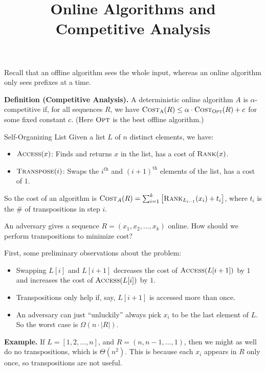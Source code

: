 \title{Online Algorithms and Competitive Analysis}



Recall that an offline algorithm sees the whole input, whereas an online algorithm only sees prefixes at a time.

\textbf{Definition (Competitive Analysis).} A deterministic online algorithm $A$ is $\alpha$-competitive if, for all sequences $R$, we have $\textsc{Cost}_{\textsc{A}}(R) \leq \alpha \cdot \textsc{Cost}_{\textsc{Opt}}(R) + c$ for some fixed constant $c$.  (Here $\textsc{Opt}$ is the best offline algorithm.)

\begin{problem}{Self-Organizing List}
    Given a list $L$ of $n$ distinct elements, we have:
    \begin{itemize}
        \item $\textsc{Access}(x)$: Finds and returns $x$ in the list, has a cost of $\textsc{Rank}(x)$.
        \item $\textsc{Transpose}(i)$: Swaps the $i^{\text{th}}$ and $(i + 1)^{\text{th}}$ elements of the list, has a cost of $1$.
    \end{itemize}
    So the cost of an algorithm is $\textsc{Cost}_A(R) = \sum_{i = 1}^k \left [ \textsc{Rank}_{L_{i - 1}}(x_i) + t_i \right ]$, where $t_i$ is the \# of transpositions in step $i$.

    An adversary gives a sequence $R = (x_1, x_2, \dots, x_k)$ online.  How should we perform transpositions to minimize cost?
\end{problem}

First, some preliminary observations about the problem:
\begin{itemize}
    \item Swapping $L[i]$ and $L[i + 1]$ decreases the cost of $\textsc{Access}(L[i + 1])$ by $1$ and increases the cost of $\textsc{Access}(L[i])$ by $1$.
    \item Transpositions only help if, say, $L[i + 1]$ is accessed more than once.
    \item An adversary can just ``unluckily'' always pick $x_i$ to be the last element of $L$.  So the worst case is $\Omega(n \cdot |R|)$.
\end{itemize}
\textbf{Example.} If $L = [1, 2, \dots, n]$, and $R = (n, n - 1, \dots, 1)$, then we might as well do no transpositions, which is $\Theta(n^2)$.  This is because each $x_i$ appears in $R$ only once, so transpositions are not useful.

